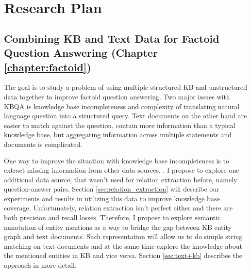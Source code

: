 \section{Research Plan}

\subsection{Combining KB and Text Data for Factoid Question Answering (Chapter \ref{chapter:factoid})}
\label{sec:plan1}

The goal is to study a problem of using multiple structured KB and unstructured data together to improve factoid question answering.
Two major issues with KBQA is knowledge base incompleteness and complexity of translating natural language question into a structured query.
Text documents on the other hand are easier to match against the question, contain more information than a typical knowledge base, but aggregating information across multiple statements and documents is complicated.

One way to improve the situation with knowledge base incompleteness is to extract missing information from other data sources, \eg \cite{Cafarella:2008:WEP:1453856.1453916,Cafarella:2009:WES:1519103.1519112,Dong:2014:KVW:2623330.2623623,Etzioni:2008:OIE:1409360.1409378,Gupta:2014:BOS:2732286.2732288,kushmerick1997wrapper}.
I propose to explore one additional data source, that wasn't used for relation extraction before, namely question-answer pairs.
Section \ref{sec:relation_extraction} will describe our experiments and results in utilizing this data to improve knowledge base coverage.
Unfortunately, relation extraction isn't perfect either and there are both precision and recall losses.
Therefore, I propose to explore semantic annotation of entity mentions as a way to bridge the gap between KB entity graph and text documents.
Such representation will allow us to do simple string matching on text documents and at the same time explore the knowledge about the mentioned entities in KB and vice versa. Section \ref{sec:text+kb} describes the approach in more detail.




